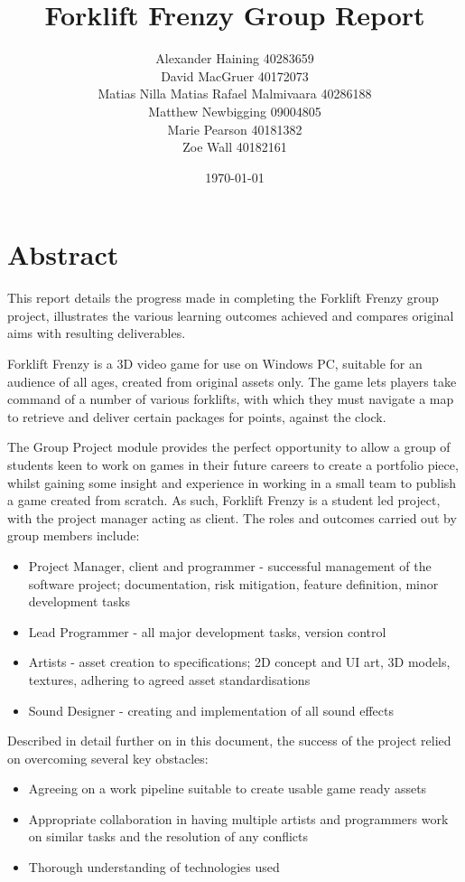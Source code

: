\documentclass[12pt]{article}
\title{Forklift Frenzy Group Report}
\author{Alexander Haining 40283659\\David MacGruer 40172073\\Matias Nilla Matias Rafael Malmivaara 40286188\\Matthew Newbigging 09004805\\Marie Pearson 40181382\\Zoe Wall 40182161}
\date{\today}
\begin{document}
\maketitle


\newpage
\tableofcontents
\newpage
{}

\section{Abstract}
	This report details the progress made in completing the Forklift Frenzy group project, illustrates the various learning outcomes achieved and compares original aims with resulting deliverables.
		
	Forklift Frenzy is a 3D video game for use on Windows PC, suitable for an audience of all ages, created from original assets only. The game lets players take command of a number of various forklifts, with which they must navigate a map to retrieve and deliver certain packages for points, against the clock.
	
	The Group Project module provides the perfect opportunity to allow a group of students keen to work on games in their future careers to create a portfolio piece, whilst gaining some insight and experience in working in a small team to publish a game created from scratch. As such, Forklift Frenzy is a student led project, with the project manager acting as client. The roles and outcomes carried out by group members include:
	\begin{itemize}
		\item Project Manager, client and programmer - successful management of the software project; documentation, risk mitigation, feature definition, minor development tasks
		\item Lead Programmer - all major development tasks, version control
		\item Artists - asset creation to specifications; 2D concept and UI
		art, 3D models, textures, adhering to agreed asset standardisations
		\item Sound Designer - creating and implementation of all sound effects
	\end{itemize}
	
	Described in detail further on in this document, the success of the project relied on overcoming several key obstacles:
	\begin{itemize}
		\item Agreeing on a work pipeline suitable to create usable game ready assets
		\item Appropriate collaboration in having multiple artists and programmers work on similar tasks and the resolution of any conflicts 
		\item Thorough understanding of technologies used
	\end{itemize}
	
\end{document}
